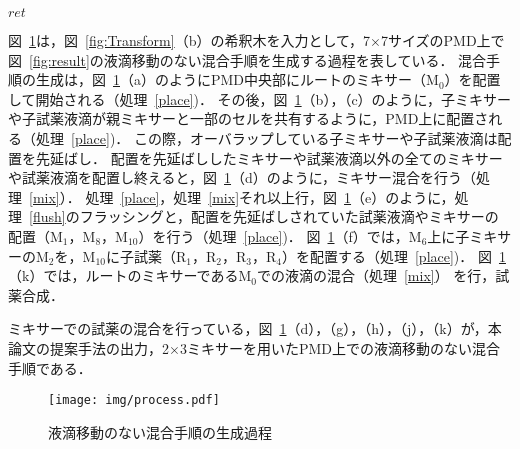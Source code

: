 \begin{algorithm}[tbp]
\begin{algorithmic}[1]
     \Return $\mathit{ret}$
     \EndFunction
 \end{algorithmic}
\end{algorithm}


図~\ref{fig:process}は，図~\ref{fig:Transform}（b）の希釈木を入力として，7$\times$7サイズのPMD上で図~\ref{fig:result}の液滴移動のない混合手順を生成する過程を表している．
混合手順の生成は，図~\ref{fig:process}（a）のようにPMD中央部にルートのミキサー（M$_0$）を配置して開始される（処理~\ref{place})．
その後，図~\ref{fig:process}（b），（c）のように，子ミキサーや子試薬液滴が親ミキサーと一部のセルを共有するように，PMD上に配置される（処理~\ref{place})．
この際，オーバラップしている子ミキサーや子試薬液滴は配置を先延ばし． 配置を先延ばししたミキサーや試薬液滴以外の全てのミキサーや試薬液滴を配置し終えると，図~\ref{fig:process}（d）のように，ミキサー混合を行う（処理~\ref{mix}）．
処理~\ref{place}，処理~\ref{mix}それ以上行，図~\ref{fig:process}（e）のように，処理~\ref{flush}のフラッシングと，配置を先延ばしされていた試薬液滴やミキサーの配置（M$_1$，M$_8$，M$_{10}$）を行う（処理~\ref{place})．
図~\ref{fig:process}（f）では，M$_6$上に子ミキサーのM$_2$を，M$_{10}$に子試薬（R$_1$，R$_2$，R$_3$，R$_4$）を配置する（処理~\ref{place})．
図~\ref{fig:process}（k）では，ルートのミキサーであるM$_0$での液滴の混合（処理~\ref{mix}） を行，試薬合成．

ミキサーでの試薬の混合を行っている，図~\ref{fig:process}（d），（g），（h），（j），（k）が，本論文の提案手法の出力，2$\times$3ミキサーを用いたPMD上での液滴移動のない混合手順である． \begin{figure}[tbp]
 \centering\texttt{[image: img/process.pdf]}
 \caption{液滴移動のない混合手順の生成過程}\label{fig:process}
\end{figure}






